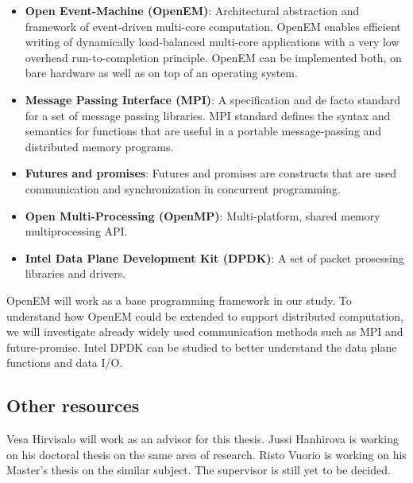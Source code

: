 \begin{itemize}

\item \textbf{Open Event-Machine (OpenEM)}: Architectural abstraction and framework of event-driven multi-core computation. OpenEM enables efficient writing of dynamically load-balanced multi-core applications with a very low overhead run-to-completion principle. OpenEM can be implemented both, on bare hardware as well as on top of an operating system.
\item \textbf{Message Passing Interface (MPI)}: A specification and de facto standard for a set of message passing libraries. MPI standard defines the syntax and semantics for functions that are useful in a portable message-passing and distributed memory programs.
\item \textbf{Futures and promises}: Futures and promises are constructs that are used communication and synchronization in concurrent programming.
\item \textbf{Open Multi-Processing (OpenMP)}: Multi-platform, shared memory multiprocessing API.
\item \textbf{Intel Data Plane Development Kit (DPDK)}: A set of packet prosessing libraries and drivers.
\end{itemize}

OpenEM will work as a base programming framework in our study. To understand how OpenEM could be extended to support distributed computation, we will investigate already widely used communication methods such as MPI and future-promise. Intel DPDK can be studied to better understand the data plane functions and data I/O.

\subsection{Other resources}
Vesa Hirvisalo will work as an advisor for this thesis. Jussi Hanhirova is working on his doctoral thesis on the same area of research. Risto Vuorio is working on his Master's thesis on the similar subject. The supervisor is still yet to be decided.


